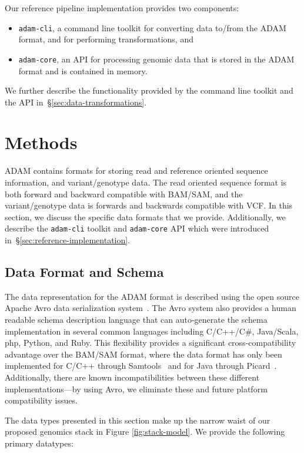 \documentclass{bioinfo}
\begin{document}
Our reference pipeline implementation provides two components:

\begin{itemize}
\item \texttt{adam-cli}, a command line toolkit for converting data to/from the ADAM format, and for performing transformations, and
\item \texttt{adam-core}, an API for processing genomic data that is stored in the ADAM format and is contained in memory.
\end{itemize}

\noindent We further describe the functionality provided by the command line toolkit and the API in~\S\ref{sec:data-transformations}.

\section{Methods}
\label{sec:methods}

ADAM contains formats for storing read and reference oriented sequence information, and variant/genotype data. The read oriented sequence format is both forward and
backward compatible with BAM/SAM, and the variant/genotype data is forwards and backwards compatible with VCF. In this section, we discuss the specific data formats
that we provide. Additionally, we describe the \texttt{adam-cli} toolkit and \texttt{adam-core} API which were introduced in~\S\ref{sec:reference-implementation}.

\subsection{Data Format and Schema}
\label{sec:data-format-and-schema}

The data representation for the ADAM format is described using the open source Apache Avro data serialization system~\citep{avro}. The Avro system also provides a human
readable schema description language that can auto-generate the schema implementation in several common languages including C/C++/C\#, Java/Scala, php, Python, and
Ruby. This flexibility provides a significant cross-compatibility advantage over the BAM/SAM format, where the data format has only been implemented for C/C++ through
Samtools~\citep{li09} and for Java through Picard~\citep{picard}. Additionally, there are known incompatibilities between these different implementations---by using Avro,
we eliminate these and future platform compatibility issues.

The data types presented in this section make up the narrow waist of our proposed genomics stack in Figure \ref{fig:stack-model}. We provide the following primary datatypes:
\end{document}
